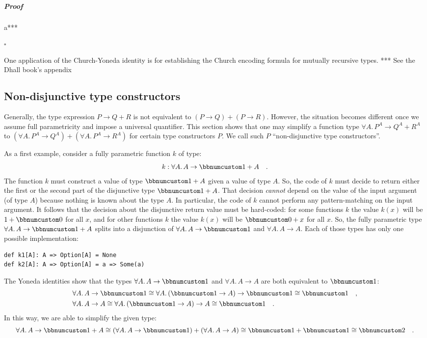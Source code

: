 \subparagraph{Proof}

a{*}{*}{*}

$\square$

One application of the Church-Yoneda identity is for establishing
the Church encoding formula for mutually recursive types. {*}{*}{*}
See the Dhall book\textsf{'}s appendix

\subsection{Non-disjunctive type constructors}

Generally, the type expression $P\rightarrow Q+R$ is not equivalent
to $(P\rightarrow Q)+(P\rightarrow R)$. However, the situation becomes
different once we assume full parametricity and impose a universal
quantifier. This section shows that one may simplify a function type
$\forall A.\,P^{A}\rightarrow Q^{A}+R^{A}$ to $(\forall A.\,P^{A}\rightarrow Q^{A})+(\forall A.\,P^{A}\rightarrow R^{A})$
for certain type constructors $P$. We call such $P$ \textsf{``}non-disjunctive
type constructors\textsf{''}.

As a first example, consider a fully parametric function $k$ of type:
\[
k:\forall A.\,A\rightarrow\bbnum 1+A\quad.
\]
The function $k$ must construct a value of type $\bbnum 1+A$ given
a value of type $A$. So, the code of $k$ must decide to return either
the first or the second part of the disjunctive type $\bbnum 1+A$.
That decision \emph{cannot} depend on the value of the input argument
(of type $A$) because nothing is known about the type $A$. In particular,
the code of $k$ cannot perform any pattern-matching on the input
argument. It follows that the decision about the disjunctive return
value must be hard-coded: for some functions $k$ the value $k(x)$
will be $1+\bbnum 0$ for all $x$, and for other functions $k$ the
value $k(x)$ will be $\bbnum 0+x$ for all $x$. So, the fully parametric
type $\forall A.\,A\rightarrow\bbnum 1+A$ splits into a disjunction
of $\forall A.\,A\rightarrow\bbnum 1$ and $\forall A.\,A\rightarrow A$.
Each of those types has only one possible implementation:
\begin{lstlisting}
def k1[A]: A => Option[A] = None
def k2[A]: A => Option[A] = a => Some(a)
\end{lstlisting}
The Yoneda identities show that the types $\forall A.\,A\rightarrow\bbnum 1$
and $\forall A.\,A\rightarrow A$ are both equivalent to $\bbnum 1$:
\begin{align*}
 & \forall A.\,A\rightarrow\bbnum 1\cong\forall A.\,(\bbnum 1\rightarrow A)\rightarrow\bbnum 1\cong\bbnum 1\quad,\\
 & \forall A.\,A\rightarrow A\cong\forall A.\,(\bbnum 1\rightarrow A)\rightarrow A\cong\bbnum 1\quad.
\end{align*}
In this way, we are able to simplify the given type:
\[
\forall A.\,A\rightarrow\bbnum 1+A\cong(\forall A.\,A\rightarrow\bbnum 1)+(\forall A.\,A\rightarrow A)\cong\bbnum 1+\bbnum 1\cong\bbnum 2\quad.
\]

